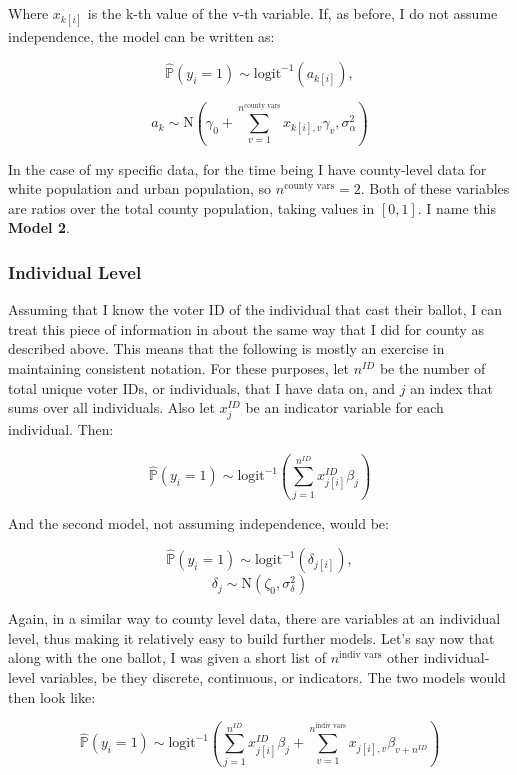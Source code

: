 \documentclass[12pt,twoside]{reedthesis}
\begin{document}
  Where \(x_{k[i]}\) is the k-th value of the v-th variable. If, as
  before, I do not assume independence, the model can be written as:
  
  \begin{equation} \tag{Model 2}  
  \hat{\mathbb{P}}(y_i = 1) \sim \text{logit}^{-1}(a_{k[i]}),
  \end{equation}
  
  \[a_{k} \sim \text{N}(\gamma_0 + \sum_{v=1}^{n^{\text{county vars}}}x_{k[i], v}\gamma_{v}, \sigma_{\alpha}^2)\]
  
  In the case of my specific data, for the time being I have county-level
  data for white population and urban population, so
  \(n^{\text{county vars}} = 2\). Both of these variables are ratios over
  the total county population, taking values in \([0,1]\). I name this
  \textbf{Model 2}.
  
  \subsubsection{Individual Level}\label{individual-level}
  
  Assuming that I know the voter ID of the individual that cast their
  ballot, I can treat this piece of information in about the same way that
  I did for county as described above. This means that the following is
  mostly an exercise in maintaining consistent notation. For these
  purposes, let \(n^{ID}\) be the number of total unique voter IDs, or
  individuals, that I have data on, and \(j\) an index that sums over all
  individuals. Also let \(x_{j}^{ID}\) be an indicator variable for each
  individual. Then:
  
  \[\hat{\mathbb{P}}(y_i = 1) \sim \text{logit}^{-1}(\sum_{j = 1}^{n^{ID}}x_{j[i]}^{ID}\beta_{j})\]
  
  And the second model, not assuming independence, would be:
  
  \[\hat{\mathbb{P}}(y_i = 1) \sim \text{logit}^{-1}(\delta_{j[i]}), \]
  \[\delta_{j} \sim \text{N}(\zeta_0, \sigma_{\delta}^2)\]
  
  Again, in a similar way to county level data, there are variables at an
  individual level, thus making it relatively easy to build further
  models. Let's say now that along with the one ballot, I was given a
  short list of \(n^{\text{indiv vars}}\) other individual-level
  variables, be they discrete, continuous, or indicators. The two models
  would then look like:
  
  \[\hat{\mathbb{P}}(y_i = 1) \sim \text{logit}^{-1}(\sum_{j = 1}^{n^{ID}}x_{j[i]}^{ID}\beta_{j} + \sum_{v=1}^{n^{\text{indiv vars}}}x_{j[i], v}\beta_{v+n^{ID}})\]
  
\end{document}
